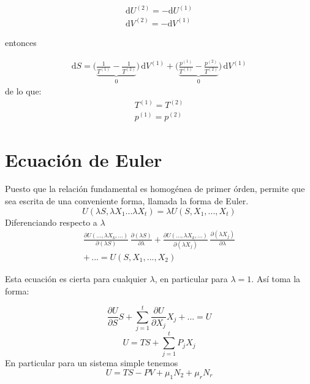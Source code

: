 \documentclass[10pt,twocolumn]{IEEEtran2e}
\newcommand{\ud}{\mathrm{d}}
\begin{document}
\begin{eqnarray}
 \ud U^{(2)}=-\ud U^{(1)}\\
 \ud V^{(2)}=-\ud V^{(1)}
\end{eqnarray}

entonces 

\begin{eqnarray}
 \ud S = \bigg(\underbrace{ \frac{1}{T^{(1)}} - \frac{1}{T^{(2)}}}_{0}\bigg)\,\ud V^{(1)} 
       + \bigg( \underbrace{ \frac{p^{(1)}}{T^{(1)}} - \frac{p^{(2)}}{T^{(2)}}}_{0} \bigg)\, \ud V^{(1)}
\end{eqnarray}
de lo que:
\begin{eqnarray}
 T^{(1)}=T^{(2)}\\
 p^{(1)}=p^{(2)}
\end{eqnarray}

\section{Ecuaci\'on de Euler}
Puesto que la relaci\'on fundamental es homog\'enea de primer \'orden, permite que sea escrita de una conveniente
forma, llamada la forma de Euler.
\begin{equation}
 U(\lambda S,\lambda X_{1} ... \lambda X_{t})=\lambda U(S,X_{1},...,X_{t})
\end{equation}
Diferenciando respecto a $\lambda$
\begin{eqnarray}
 \frac{\partial U(...,\lambda X_{k},...)}{\partial (\lambda S)} \, \frac{\partial(\lambda S)}{\partial \lambda}+
\frac{\partial U(...,\lambda X_{k},...)}{\partial (\lambda X_{j})} \, \frac{\partial(\lambda X_{j})}{\partial \lambda} \nonumber\\
 + \,...= U(S,X_{1},...,X_{2})
\end{eqnarray}

Esta ecuaci\'on es cierta para cualquier $\lambda$, en particular para $\lambda=1$. As\'i toma la forma:

\begin{equation}
 \frac{\partial U}{\partial S} S + \sum_{j=1}^{t} \frac{\partial U}{\partial X_{j}}X_{j} + ... =U
\end{equation}
\begin{equation}
 U=TS + \sum_{j=1}^{t}P_{j}X_{j}
\end{equation}
En particular para un sistema simple tenemos
\begin{equation}
 U=TS-PV+\mu_{1}N_{2}+\mu_{r}N_{r}
\end{equation}
\end{document}
